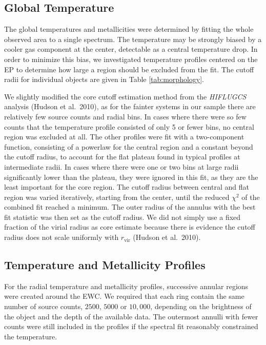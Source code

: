 \documentclass[structabstract]{aa}
\begin{document}
\subsection{Global Temperature} \label{globalt} The global
temperatures and metallicities were determined by fitting the whole
observed area to a single spectrum. The temperature may be strongly
biased by a cooler gas component at the center, detectable as a
central temperature drop. In order to minimize this bias, we
investigated temperature profiles centered on the EP to determine how
large a region should be excluded from the fit. The cutoff radii for
individual objects are given in Table \ref{tab:morphology}.

We slightly modified the core cutoff estimation method from the
\emph{HIFLUGCS} analysis (Hudson et al.\ 2010), as for the fainter
systems in our sample there are relatively few source counts and
radial bins. In cases where there were so few counts that the
temperature profile consisted of only 5 or fewer bins, no central
region was excluded at all. The other profiles were fit with a
two-component function, consisting of a powerlaw for the central
region and a constant beyond the cutoff radius, to account for the
flat plateau found in typical profiles at intermediate radii. In cases
where there were one or two bins at large radii significantly lower
than the plateau, they were ignored in this fit, as they are the least
important for the core region. The cutoff radius between central and
flat region was varied iteratively, starting from the center, until
the reduced $\chi^2$ of the combined fit reached a minimum. The outer
radius of the annulus with the best fit statistic was then set as the
cutoff radius. We did not simply use a fixed fraction of the virial
radius as core estimate because there is evidence the cutoff radius
does not scale uniformly with $r_{\text{vir}}$ (Hudson et al.\ 2010).
%
 \subsection{Temperature and Metallicity Prof\hspace{0mm}iles}\label{tprofiles}
For the radial temperature and metallicity profiles, successive annular
regions were created around the EWC. We required that each ring contain the
same number of source counts, $2500$, $5000$ or $10,000$, depending on the
brightness of the object and the depth of the available data. The outermost
annulli with fewer counts were still included in the
profiles if the spectral fit reasonably constrained the temperature.
\end{document}
